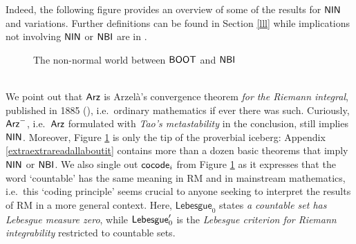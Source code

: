 \documentclass[reqno]{amsart}
\def\Z{\textup{\textsf{Z}}}
\def\NFP{\textup{\textsf{NFP}}}
\def\WKL{\textup{\textsf{WKL}}}
\def\ACA{\textup{\textsf{ACA}}}
\def\HBU{\textup{\textsf{HBU}}}
\def\BW{\textup{\textsf{BW}}}
\def\LEB{\textup{\textsf{Lebesgue}}}
\def\cocode{\textup{\textsf{cocode}}}
\def\DCA{\Delta\textup{\textsf{-CA}}}
\def\NCC{\textup{\textsf{NCC}}}
\def\NBI{\textup{\textsf{NBI}}}
\def\Arz{\textup{\textsf{Arz}}}
\def\NIN{\textup{\textsf{NIN}}}
\def\BCT{\textup{\textsf{BCT}}}
\def\BOOT{\textup{\textsf{BOOT}}}
\def\WHBU{\textup{\textsf{WHBU}}}
\def\HBC{\textup{\textsf{HBC}}}
\numberwithin{equation}{section}
\numberwithin{thm}{section}
\begin{document}
\smallskip

Indeed, the following figure provides an overview of some of the results for $\NIN$ and variations.   
Further definitions can be found in Section \ref{lll} while implications not involving $\NIN$ or $\NBI$ are in \cites{samph, dagsamIII, dagsamV, dagsamVII, dagsamVI}.
\vspace{-2mm}
\begin{figure}[h]
\caption{The non-normal world between $\BOOT$ and $\NBI$}
\label{dd}
\end{figure}~\\
We point out that $\Arz$ is Arzel\`a's convergence theorem \emph{for the Riemann integral}, published in 1885 (\cite{arse2}), i.e.\ ordinary mathematics if ever there was such.  
Curiously, $\Arz^{-}$, i.e.\ $\Arz$ formulated with \emph{Tao's metastability} in the conclusion, still implies $\NIN$.
Moreover, Figure \ref{dd} is only the tip of the proverbial iceberg: Appendix \ref{extraextrareadallaboutit} contains more than a dozen basic theorems that imply $\NIN$ or $\NBI$.
We also single out $\cocode_{i}$ from Figure \ref{dd} as it expresses that the word `countable' has the same meaning in RM and in mainstream mathematics, i.e.\ this `coding principle' seems crucial to anyone seeking to interpret the results of RM in a more general context.  Here, $\textsf{Lebesgue}_{0}$ states \emph{a countable set has Lebesgue measure zero}, while $\LEB_{0}'$ is the \emph{Lebesgue criterion for Riemann integrability} restricted to countable sets. 
\end{document}
